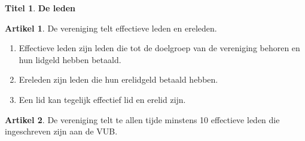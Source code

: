 \documentclass[a4paper,10pt]{article}
\theoremstyle{definition}
\newtheorem{titel}{\newline\Large Titel}
\newtheorem{artikel}{\large Artikel}
\newcommand{\ttext}[1]{\Large \textbf{#1} \normalsize}
\newcommand{\ttextcr}{\hfill\newline}
\begin{document}

\begin{titel}\ttext{De leden}

  \begin{artikel}\ttextcr
    De vereniging telt effectieve leden en ereleden.
    \begin{enumerate}
      \item
        Effectieve leden zijn leden die tot de doelgroep van de vereniging behoren en hun lidgeld hebben betaald.
      \item
        Ereleden zijn leden die hun erelidgeld betaald hebben.
      \item
        Een lid kan tegelijk effectief lid en erelid zijn.
    \end{enumerate}
  \end{artikel}

  \begin{artikel}\ttextcr
    De vereniging telt te allen tijde minstens 10 effectieve leden die ingeschreven zijn aan de VUB.
  \end{artikel}

\end{titel}

\end{document}
